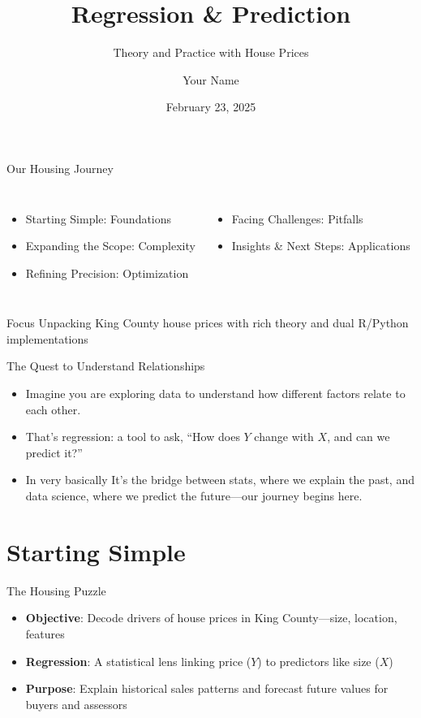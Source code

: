 \documentclass{beamer}
\title{Regression \& Prediction}
\subtitle{Theory and Practice with House Prices}
\author{Your Name}
\institute{xAI}
\date{February 23, 2025}
\begin{document}
	
	\begin{frame}
		\titlepage
	\end{frame}
	
	\begin{frame}{Our Housing Journey}
		\begin{columns}
			\column{0.5\textwidth}
			\begin{itemize}
				\item Starting Simple: Foundations
				\item Expanding the Scope: Complexity
				\item Refining Precision: Optimization
			\end{itemize}
			\column{0.5\textwidth}
			\begin{itemize}
				\item Facing Challenges: Pitfalls
				\item Insights \& Next Steps: Applications
			\end{itemize}
		\end{columns}
		\metroset{block=fill}
		\begin{block}{Focus}
			Unpacking King County house prices with rich theory and dual R/Python implementations
		\end{block}
	\end{frame}
	
	\begin{frame}{The Quest to Understand Relationships}
		\begin{itemize}
			\item Imagine you are exploring data to understand how different factors relate to each other.
			\item That’s regression: a tool to ask, ``How does $Y$ change with $X$, and can we predict it?''
			\item In very basically It’s the bridge between stats, where we explain the past, and data science, where we predict the future—our journey begins here.
		\end{itemize}
	\end{frame}
	
	
	\section{Starting Simple}
	
	\begin{frame}{The Housing Puzzle}
		\begin{itemize}
			\item \textbf{Objective}: Decode drivers of house prices in King County—size, location, features
			\item \textbf{Regression}: A statistical lens linking price ($Y$) to predictors like size ($X$)
			\item \textbf{Purpose}: Explain historical sales patterns and forecast future values for buyers and assessors
		\end{itemize}
	\end{frame}
	
\end{document}
